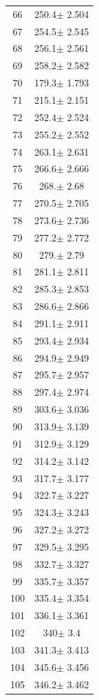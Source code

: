 \documentclass[a4paper]{instrumentacao}
\begin{document}
\begin{longtable}{cc}
 66 & 250.4$\pm$ 2.504 \\
 67 & 254.5$\pm$ 2.545 \\
 68 & 256.1$\pm$ 2.561 \\
 69 & 258.2$\pm$ 2.582 \\
 70 & 179.3$\pm$ 1.793 \\
 71 & 215.1$\pm$ 2.151 \\
 72 & 252.4$\pm$ 2.524 \\
 73 & 255.2$\pm$ 2.552 \\
 74 & 263.1$\pm$ 2.631 \\
 75 & 266.6$\pm$ 2.666 \\
 76 & 268.$\pm$ 2.68 \\
 77 & 270.5$\pm$ 2.705 \\
 78 & 273.6$\pm$ 2.736 \\
 79 & 277.2$\pm$ 2.772 \\
 80 & 279.$\pm$ 2.79 \\
 81 & 281.1$\pm$ 2.811 \\
 82 & 285.3$\pm$ 2.853 \\
 83 & 286.6$\pm$ 2.866 \\
 84 & 291.1$\pm$ 2.911 \\
 85 & 293.4$\pm$ 2.934 \\
 86 & 294.9$\pm$ 2.949 \\
 87 & 295.7$\pm$ 2.957 \\
 88 & 297.4$\pm$ 2.974 \\
 89 & 303.6$\pm$ 3.036 \\
 90 & 313.9$\pm$ 3.139 \\
 91 & 312.9$\pm$ 3.129 \\
 92 & 314.2$\pm$ 3.142 \\
 93 & 317.7$\pm$ 3.177 \\
 94 & 322.7$\pm$ 3.227 \\
 95 & 324.3$\pm$ 3.243 \\
 96 & 327.2$\pm$ 3.272 \\
 97 & 329.5$\pm$ 3.295 \\
 98 & 332.7$\pm$ 3.327 \\
 99 & 335.7$\pm$ 3.357 \\
 100 & 335.4$\pm$ 3.354 \\
 101 & 336.1$\pm$ 3.361 \\
 102 & 340$\pm$ 3.4 \\
 103 & 341.3$\pm$ 3.413 \\
 104 & 345.6$\pm$ 3.456 \\
 105 & 346.2$\pm$ 3.462 \\

\end{longtable}
\end{document}

